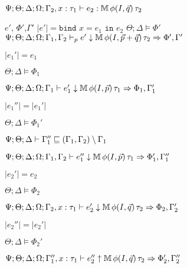 {{{     $\Psi ; \Theta; \Delta ; \Omega ; \Gamma_2, x:\tau_1 \vdash e_2 : \mathbb{M} \, \phi(I,\vec{q})\, \tau_2$

  }{
    $e'$, $\Phi'$,$\Gamma'$  
  }{
    $|e'| = \texttt{bind } x = e_1 \texttt{ in } e_2$
  }{
    $\Theta ; \Delta \vDash \Phi'$  
  }{
    $\Psi ; \Theta ; \Delta ; \Omega ; \Gamma_1,\Gamma_2 \vdash_p e' \downarrow \mathbb{M} \, \phi(I,\vec{p} + \vec{q})\, \tau_2 \Rightarrow \Phi',\Gamma'$  
  }


   $|e_1'| = e_1$

   $\Theta ; \Delta \vDash \Phi_1$

   $\Psi  ; \Theta ; \Delta ; \Omega ; \Gamma_1 \vdash e_1' \downarrow \mathbb{M} \, \phi(I,\vec{p}) \, \tau_1 \Rightarrow \Phi_1,\Gamma_1'$


   $|e_1''| = |e_1'|$

   $\Theta ; \Delta \vDash \Phi_1'$

   $\Psi ; \Theta ; \Delta \vdash \Gamma_1'' \sqsubseteq (\Gamma_1,\Gamma_2) \setminus \Gamma_1$

   $\Psi ; \Theta ; \Delta ; \Omega ; \Gamma_1,\Gamma_2 \vdash e_1'' \downarrow \mathbb{M} \, \phi(I,\vec{p}) \, \tau_1 \Rightarrow \Phi_1',\Gamma_1''$

  
   $|e_2'| = e_2$

   $\Theta ; \Delta \vDash \Phi_2$

   $\Psi ; \Theta; \Delta ; \Omega ; \Gamma_2, x:\tau_1 \vdash e_2' \downarrow \mathbb{M} \, \phi(I,\vec{q})\, \tau_2 \Rightarrow \Phi_2,\Gamma_2'$
  

   $|e_2''| = |e_2'|$

   $\Theta ; \Delta \vDash \Phi_2'$

   $\Psi ; \Theta ; \Delta ; \Omega ; \Gamma_1'', x : \tau_1 \vdash e_2'' \uparrow \mathbb{M} \, \phi(I,\vec{q}) \, \tau_2 \Rightarrow \Phi_2',\Gamma_2''$


}}
